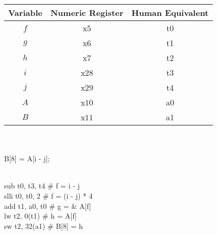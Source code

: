 \documentclass[12pt]{article}
\begin{document}
	\begin{center}
		
		\begin{tabular}{ |c|c|c| } 
			\hline
			Variable & Numeric Register & Human Equivalent \\
			\hline
			$f$ & x$5$ & t0 \\ 
			\hline
			$g$ & x$6$  &  t1 \\ 
			\hline
			$h$ & x$7$  &  t2 \\ 
			\hline
			$i$ & x$28$  & t3 \\
			\hline
			$j$ & x$29$  &  t4 \\ 
			\hline
			$A$ & x$10$  &  a0 \\ 
			\hline
			$B$ & x$11$  &  a1 \\
			\hline
			
		\end{tabular}
		\vspace{0.8cm} \\
		 \vspace{0.3cm} \\
		
		B[8] = A[i - j]; \vspace{0.5cm} \\
		
		 \vspace{0.08cm} \\
		
		\begin{flushleft}
			\hspace{4cm} sub t0, t3, t4 \hspace{.7cm}  \# f = i - j \\
			\hspace{4cm} slli t0, t0, 2 \hspace{1cm}  \# f = (i - j) * 4 \\
			\hspace{4cm} add t1, a0, t0 \hspace{.63cm}  \# g = \& A[f] \\ 
			\hspace{4cm} lw t2, 0(t1)  \hspace{1.04cm}   \# h = A[f]\\
			\hspace{4cm} sw t2, 32(a1)  \hspace{.75cm}  \# B[8] = h\\
		\end{flushleft}
		
		\end{center}
		
\end{document}

